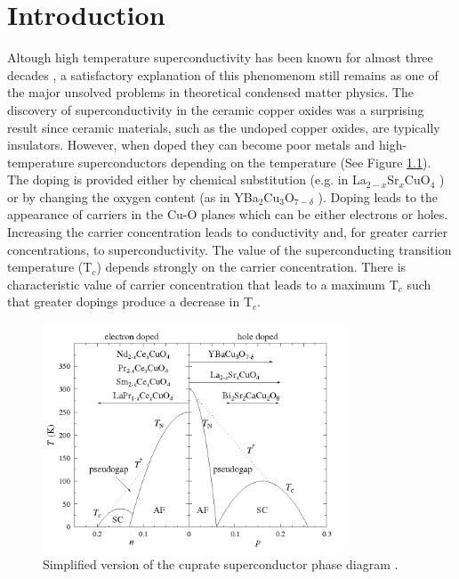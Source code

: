 \chapter{Introduction}
\label{chap:introduction}

Altough high temperature superconductivity has been known for almost three decades \cite{Bednorz1986}, a satisfactory explanation of this phenomenom still remains as one of the major unsolved problems in theoretical condensed matter physics. 
The discovery of superconductivity in the ceramic copper oxides was a surprising result since ceramic materials, such as the undoped copper oxides, are typically insulators.
However, when doped they can become poor metals and high-temperature superconductors depending on the temperature (See Figure \ref{fig:CuPhaseDiag}). 
The doping is provided either by chemical substitution (e.g. in La$_{2-x}$Sr$_x$CuO$_4$ \cite{Cava1987}) or by changing the oxygen content (as in YBa$_2$Cu$_3$O$_{7-\delta}$ \cite{Wu1987}). 
Doping leads to the appearance of carriers in the Cu-O planes which can be either electrons or holes.
Increasing the carrier concentration leads to conductivity and, for greater carrier concentrations, to superconductivity. 
The value of the superconducting transition temperature (T$_c$) depends strongly on the carrier concentration.
There is characteristic value of carrier concentration that leads to a maximum T$_c$ such that greater dopings produce a decrease in T$_c$.

\begin{figure}[ht]
  \centering
  \includegraphics[width=0.8\textwidth]{images/CuPhaseDiag.png}
  \caption[Simplified version of the cuprate superconductor phase diagram]
  {Simplified version of the cuprate superconductor phase diagram \protect\cite{CuPhaseDiag}.}
  \label{fig:CuPhaseDiag}
\end{figure}

